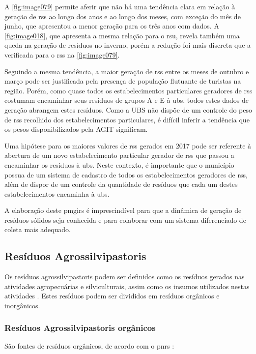 A \autoref{fig:image079} permite aferir que não há uma tendência clara em relação à geração de \gls{rss} ao longo dos anos e ao longo dos meses, com exceção do mês de junho, que apresentou a menor geração para os três anos com dados. A \autoref{fig:image018}, que apresenta a mesma relação para o \gls{rsu}, revela também uma queda na geração de resíduos no inverno, porém a redução foi mais discreta que a verificada para o \gls{rss} na \autoref{fig:image079}.

Seguindo a mesma tendência, a maior geração de \gls{rss} entre os meses de outubro e março pode ser justificada pela presença de população flutuante de turistas na região. Porém, como quase todos os estabelecimentos particulares geradores de \gls{rss} costumam encaminhar seus resíduos de grupos A e E à \gls{ubs}, todos estes dados de geração abrangem estes resíduos. Como a UBS não dispõe de um controle do peso de \gls{rss} recolhido dos estabelecimentos particulares, é difícil inferir a tendência que os pesos disponibilizados pela AGIT significam.

Uma hipótese para os maiores valores de \gls{rss} gerados em 2017 pode ser referente à abertura de um novo estabelecimento particular gerador de \gls{rss} que passou a encaminhar os resíduos à \gls{ubs}. Neste contexto, é importante que o município possua de um sistema de cadastro de todos os estabelecimentos geradores de \gls{rss}, além de dispor de um controle da quantidade de resíduos que cada um destes estabelecimentos encaminha à \gls{ubs}. 

A elaboração deste \gls{pmgirs} é imprescindível para que a dinâmica de geração de resíduos sólidos seja conhecida e para colaborar com um sistema diferenciado de coleta mais adequado.


\subsection{Resíduos Agrossilvipastoris}
\label{sub_agro}

Os resíduos agrossilvipastoris podem ser definidos como os resíduos gerados nas atividades agropecuárias e silviculturais, assim como os insumos utilizados nestas atividades \cite{brasil:12305}. Estes resíduos podem ser divididos em resíduos orgânicos e inorgânicos.

\subsubsection{Resíduos Agrossilvipastoris orgânicos}
São fontes de resíduos orgânicos, de acordo com o \gls{pnrs} \cite{MMA2012}:

